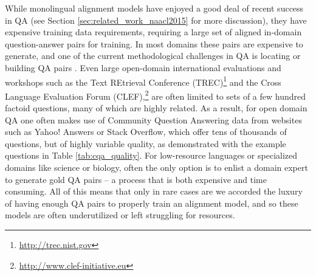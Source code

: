 While monolingual alignment models have enjoyed a good deal of recent success in QA (see Section \ref{sec:related_work_naacl2015} for more discussion), they have expensive training data requirements,  
requiring a large set of aligned in-domain question-answer pairs for training.
In most domains these pairs are expensive to generate, and one of the current methodological challenges in QA is locating or building QA pairs . Even large open-domain international evaluations and workshops such as the Text REtrieval Conference (TREC)\footnote{\url{http://trec.nist.gov}} and the Cross Language Evaluation Forum (CLEF),\footnote{\url{http://www.clef-initiative.eu}} are often limited to sets of a few hundred factoid questions, many of which are highly related.  As a result, for open domain QA one often makes use of Community Question Answering data from websites such as Yahoo! Answers or Stack Overflow, which offer tens of thousands of questions, but of highly variable quality, as demonstrated with the example questions in Table \ref{tab:cqa_quality}.  
For low-resource languages or specialized domains like science or biology, often the only option is to enlist a domain expert to generate gold QA pairs --  a process that is both expensive and time consuming.  All of this means that only in rare cases are we accorded the luxury of having enough QA pairs to properly train an alignment model, and so these models are often underutilized or left struggling for resources. 


